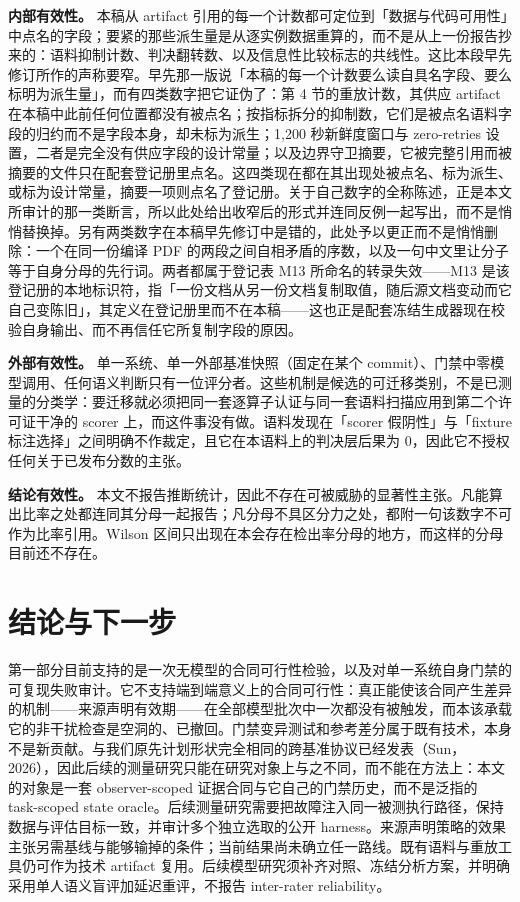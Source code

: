 \documentclass[UTF8,11pt]{ctexart}
\begin{document}
\noindent\textbf{内部有效性。} 本稿从 artifact 引用的每一个计数都可定位到「数据与代码可用性」中点名的字段；要紧的那些派生量是从逐实例数据重算的，而不是从上一份报告抄来的：语料抑制计数、判决翻转数、以及信息性比较标志的共线性。这比本段早先修订所作的声称要窄。早先那一版说「本稿的每一个计数要么读自具名字段、要么标明为派生量」，而有四类数字把它证伪了：第 4 节的重放计数，其供应 artifact 在本稿中此前任何位置都没有被点名；按指标拆分的抑制数，它们是被点名语料字段的归约而不是字段本身，却未标为派生；1,200 秒新鲜度窗口与 zero-retries 设置，二者是完全没有供应字段的设计常量；以及边界守卫摘要，它被完整引用而被摘要的文件只在配套登记册里点名。这四类现在都在其出现处被点名、标为派生、或标为设计常量，摘要一项则点名了登记册。关于自己数字的全称陈述，正是本文所审计的那一类断言，所以此处给出收窄后的形式并连同反例一起写出，而不是悄悄替换掉。另有两类数字在本稿早先修订中是错的，此处予以更正而不是悄悄删除：一个在同一份编译 PDF 的两段之间自相矛盾的序数，以及一句中文里让分子等于自身分母的先行词。两者都属于登记表 M13 所命名的转录失效——M13 是该登记册的本地标识符，指「一份文档从另一份文档复制取值，随后源文档变动而它自己变陈旧」，其定义在登记册里而不在本稿——这也正是配套冻结生成器现在校验自身输出、而不再信任它所复制字段的原因。

\noindent\textbf{外部有效性。} 单一系统、单一外部基准快照（固定在某个 commit）、门禁中零模型调用、任何语义判断只有一位评分者。这些机制是候选的可迁移类别，不是已测量的分类学：要迁移就必须把同一套逐算子认证与同一套语料扫描应用到第二个许可证干净的 scorer 上，而这件事没有做。语料发现在「scorer 假阴性」与「fixture 标注选择」之间明确不作裁定，且它在本语料上的判决层后果为 0，因此它不授权任何关于已发布分数的主张。

\noindent\textbf{结论有效性。} 本文不报告推断统计，因此不存在可被威胁的显著性主张。凡能算出比率之处都连同其分母一起报告；凡分母不具区分力之处，都附一句该数字不可作为比率引用。Wilson 区间只出现在本会存在检出率分母的地方，而这样的分母目前还不存在。

\section{结论与下一步}
第一部分目前支持的是一次无模型的合同可行性检验，以及对单一系统自身门禁的可复现失败审计。它不支持端到端意义上的合同可行性：真正能使该合同产生差异的机制——来源声明有效期——在全部模型批次中一次都没有被触发，而本该承载它的非干扰检查是空洞的、已撤回。门禁变异测试和参考差分属于既有技术，本身不是新贡献。与我们原先计划形状完全相同的跨基准协议已经发表（Sun，2026），因此后续的测量研究只能在研究对象上与之不同，而不能在方法上：本文的对象是一套 observer-scoped 证据合同与它自己的门禁历史，而不是泛指的 task-scoped state oracle。后续测量研究需要把故障注入同一被测执行路径，保持数据与评估目标一致，并审计多个独立选取的公开 harness。来源声明策略的效果主张另需基线与能够输掉的条件；当前结果尚未确立任一路线。既有语料与重放工具仍可作为技术 artifact 复用。后续模型研究须补齐对照、冻结分析方案，并明确采用单人语义盲评加延迟重评，不报告 inter-rater reliability。
\end{document}
